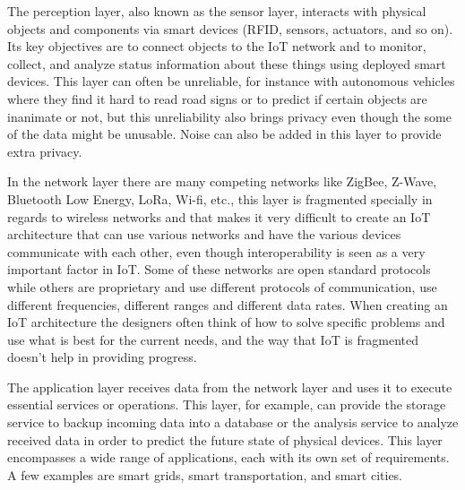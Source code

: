 \documentclass[conference]{IEEEtran}
\begin{document}
The perception layer, also known as the sensor layer, interacts with physical
objects and components via smart devices (RFID, sensors, actuators, and so on).
Its key objectives are to connect objects to the IoT network and to monitor,
collect, and analyze status information about these things using deployed
smart devices. This layer can often be unreliable, for instance with autonomous
vehicles where they find it hard to read road signs or to predict if certain
objects are inanimate or not, but this unreliability also brings privacy
even though the some of the data might be unusable. Noise can also be added in
this layer to provide extra privacy.

In the network layer there are many competing networks like ZigBee, Z-Wave,
Bluetooth Low Energy, LoRa, Wi-fi, etc., this layer is fragmented specially
in regards to wireless networks and that makes it very difficult to create
an IoT architecture that can use various networks and have the various
devices communicate with each other, even though interoperability is seen
as a very important factor in IoT. Some of these networks are open standard
protocols while others are proprietary and use different protocols of communication,
use different frequencies, different ranges and different data rates. When
creating an IoT architecture the designers often think of how to solve
specific problems and use what is best for the current needs, and the way
that IoT is fragmented doesn't help in providing progress.

The application layer receives data from the network layer and uses it to
execute essential services or operations. This layer, for example, can provide
the storage service to backup incoming data into a database or the analysis
service to analyze received data in order to predict the future state of
physical devices. This layer encompasses a wide range of applications,
each with its own set of requirements. A few examples are smart grids,
smart transportation, and smart cities.

\end{document}
